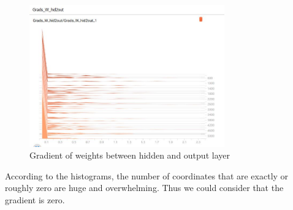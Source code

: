 \documentclass{article}
\begin{document}
  \begin{figure}[H]
  \centering
  \includegraphics[width=0.75\textwidth]{G_W_hid2out.jpg}
  \caption{Gradient of weights between hidden and output layer}\label{}
  \end{figure}
According to the histograms, the number of coordinates that are exactly or roughly zero are huge and overwhelming. Thus we could consider that the gradient is zero.
\end{document}
